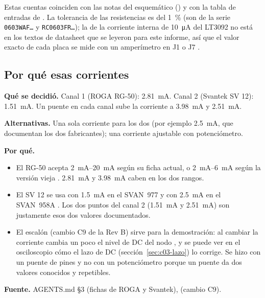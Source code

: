 Estas cuentas coinciden con las notas del esquemático () y con la tabla de entradas
de . La tolerancia de las resistencias es del \SI{1}{\percent} (son de la serie
\texttt{0603WAF…} y \texttt{RC0603FR…}); la de la corriente interna de \SI{10}{\micro\ampere} del LT3092 no está en los
textos de datasheet que se leyeron para este informe, así que el valor exacto de cada placa se mide con un
amperímetro en J1 o J7 \medir.

\subsection{Por qué esas corrientes}

\begin{decision}
\textbf{Qué se decidió.} Canal 1 (ROGA RG-50): \SI{2.81}{\milli\ampere}. Canal 2 (Svantek SV 12): \SI{1.51}{\milli\ampere}.
Un puente en cada canal sube la corriente a \SI{3.98}{\milli\ampere} y \SI{2.51}{\milli\ampere}.

\textbf{Alternativas.} Una sola corriente para los dos (por ejemplo \SI{2.5}{\milli\ampere}, que documentan los dos
fabricantes); una corriente ajustable con potenciómetro.

\textbf{Por qué.}
\begin{itemize}
  \item El RG-50 acepta \SIrange{2}{20}{\milli\ampere} según su ficha actual, o \SIrange{2}{6}{\milli\ampere} según la
        versión vieja . \SI{2.81}{\milli\ampere} y \SI{3.98}{\milli\ampere} caben en los dos rangos.
  \item El SV 12 se usa con \SI{1.5}{\milli\ampere} en el SVAN~977 y con \SI{2.5}{\milli\ampere} en el SVAN~958A
        . Los dos puntos del canal 2 (\SI{1.51}{\milli\ampere} y \SI{2.51}{\milli\ampere}) son
        justamente esos dos valores documentados.
  \item El escalón (cambio C9 de la Rev B) sirve para la demostración: al cambiar la corriente cambia un poco el nivel
        de DC del nodo , y se puede ver en el osciloscopio cómo el lazo de DC (sección~\ref{sec:c03-lazo}) lo
        corrige. Se hizo con un puente de pines y no con un potenciómetro porque un puente da dos valores conocidos y
        repetibles.
\end{itemize}

\textbf{Fuente.} AGENTS.md §3 (fichas de ROGA y Svantek),  (cambio C9).
\end{decision}

